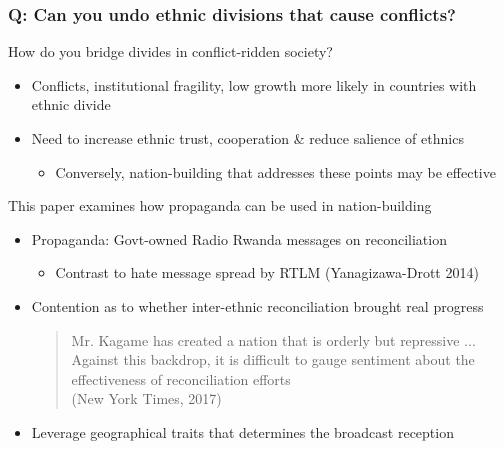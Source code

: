 \documentclass[aspectratio=169]{beamer}
\begin{document}
\begin{frame}
\frametitle{Q: Can you undo ethnic divisions that cause conflicts?} 
How do you bridge divides in conflict-ridden society?
\begin{itemize}\setlength\itemsep{3pt}
\item Conflicts, institutional fragility, low growth more likely in countries with ethnic divide
\item Need to increase ethnic trust, cooperation \& reduce salience of ethnics
\begin{itemize}
\item Conversely, nation-building that addresses these points may be effective
\end{itemize}
\end{itemize}\medskip
This paper examines how propaganda can be used in nation-building
\begin{itemize}\setlength\itemsep{3pt}
  \item Propaganda: Govt-owned Radio Rwanda messages on reconciliation
  \begin{itemize}
  \item Contrast to hate message spread by RTLM (Yanagizawa-Drott 2014)
  \end{itemize}
\item Contention as to whether inter-ethnic reconciliation brought real progress 
\begin{quote}
  Mr. Kagame has created a nation that is orderly but repressive ... Against this backdrop, it is difficult to gauge sentiment about the effectiveness of reconciliation efforts \\ (New York Times, 2017)
\end{quote}
\item Leverage geographical traits that determines the broadcast reception
\end{itemize}\medskip
\end{frame}
\end{document}

